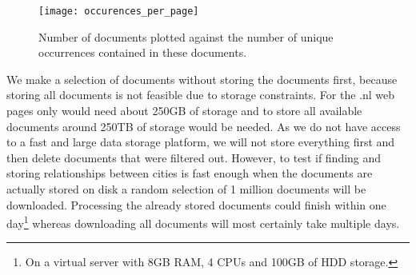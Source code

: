 \begin{figure}[H]
    \centering
    \texttt{[image: occurences\_per\_page]}
    \caption{Number of documents plotted against the number of unique occurrences contained in these documents.}
    \label{fig:occ_per_page}
\end{figure}

We make a selection of documents without storing the documents first, because storing all documents is not feasible due to storage constraints. For the .nl web pages only would need about 250GB of storage and to store all available documents around 250TB of storage would be needed. As we do not have access to a fast and large data storage platform, we will not store everything first and then delete documents that were filtered out. However, to test if finding and storing relationships between cities is fast enough when the documents are actually stored on disk a random selection of 1 million documents will be downloaded. Processing the already stored documents could finish within one day\footnote{On a virtual server with 8GB RAM, 4 CPUs and 100GB of HDD storage.} whereas downloading all documents will most certainly take multiple days.




